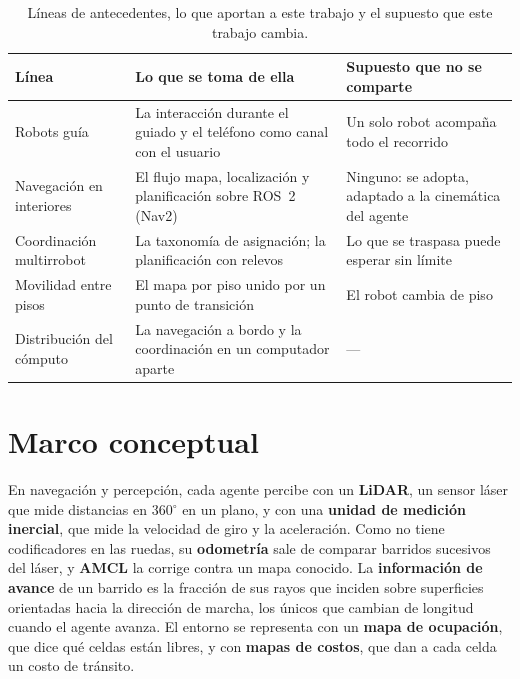 \begin{table}[H]
  \centering\footnotesize
  \caption{Líneas de antecedentes, lo que aportan a este trabajo y el supuesto
    que este trabajo cambia.}
  \label{tab:antecedentes}
  \begin{tabular}{@{}p{}p{}p{}@{}}
    \toprule
    \textbf{Línea} & \textbf{Lo que se toma de ella} & \textbf{Supuesto que no se comparte} \\ \midrule
    Robots guía & La interacción durante el guiado y el teléfono como canal con el usuario & Un solo robot acompaña todo el recorrido \\ \addlinespace
    Navegación en interiores & El flujo mapa, localización y planificación sobre ROS~2 (Nav2) & Ninguno: se adopta, adaptado a la cinemática del agente \\ \addlinespace
    Coordinación multirrobot & La taxonomía de asignación; la planificación con relevos & Lo que se traspasa puede esperar sin límite \\ \addlinespace
    Movilidad entre pisos & El mapa por piso unido por un punto de transición & El robot cambia de piso \\ \addlinespace
    Distribución del cómputo & La navegación a bordo y la coordinación en un computador aparte & --- \\ \bottomrule
  \end{tabular}
\end{table}

\section{Marco conceptual}
\label{sec:conceptual}

En navegación y percepción, cada agente percibe con un \textbf{LiDAR}, un sensor láser que mide distancias en 360$^\circ$ en un plano, y con una \textbf{unidad de medición inercial}, que mide la velocidad de giro y la aceleración. Como no tiene codificadores en las ruedas, su \textbf{odometría} sale de comparar barridos sucesivos del láser, y \textbf{AMCL} la corrige contra un mapa conocido. La \textbf{información de avance} de un barrido es la fracción de sus rayos que inciden sobre superficies orientadas hacia la dirección de marcha, los únicos que cambian de longitud cuando el agente avanza. El entorno se representa con un \textbf{mapa de ocupación}, que dice qué celdas están libres, y con \textbf{mapas de costos}, que dan a cada celda un costo de tránsito.

